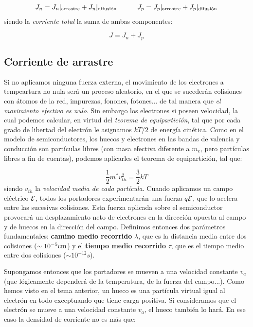 \begin{equation}
	J_n =  {J_n}|_{\text{arrastre}} + {J_n}|_{\text{difusión}} \quad \quad \quad
	J_p =  {J_p}|_{\text{arrastre}} + {J_p}|_{\text{difusión}} 
\end{equation}
siendo la \textit{corriente total} la suma de ambas componentes: 

\begin{equation}
	J = J_n + J_p
\end{equation}

\subsection{Corriente de arrastre}

Si no aplicamos ninguna fuerza externa, el movimiento de los electrones a tempeartura no nula será un proceso aleatorio, en el que se sucederán colisiones con átomos de la red, impurezas, fonones, fotones... de tal manera que \textit{el movimiento efectivo es nulo}. Sin embargo los electrones si poseen velocidad, la cual podemos calcular, en virtud del \textit{teorema de equipartición}, tal que por cada grado de libertad del electrón le asignamos $kT/2$ de energía cinética. Como en el modelo de semiconductores, los huecos y electrones en las bandas de valencia y conducción son partículas libres (con masa efectiva diferente a $m_e$, pero partículas libres a fin de cuentas), podemos aplicarles el teorema de equipartición, tal que:

\begin{equation}
	\frac{1}{2} m^* v_{th}^2 = \frac{3}{2} kT
\end{equation}
siendo $v_{th}$ la \textit{velocidad media de cada partícula}. Cuando aplicamos un campo eléctrico $\mathcal{E}$, todos los portadores experimentarán una fuerza $q\mathcal{E}$, que lo acelera entre las sucesivas colisiones. Esta fuerza aplicada sobre el semiconductor provocará un desplazamiento neto de electrones en la dirección opuesta al campo y de huecos en la dirección del campo. Definimos entonces dos parámetros fundamentales: \textbf{camino medio recorrido} $\lambda$, que es la distancia media entre dos colisiones $(\sim 10^{-5} \text{cm}$) y el \textbf{tiempo medio recorrido} $\tau$, que es el tiempo medio entre dos colisiones ($\sim 10^{-12} s$). 

Supongamos entonces que los portadores se mueven a una velocidad constante $v_a$ (que lógicamente dependerá de la temperatura, de la fuerza del campo...). Como hemos visto en el tema anterior, un hueco es una partícula virtual igual al electrón en todo exceptuando que tiene carga positiva. Si consideramos que el electrón se mueve a una velocidad constante $v_a$, el hueco también lo hará. En ese caso la densidad de corriente no es más que:

